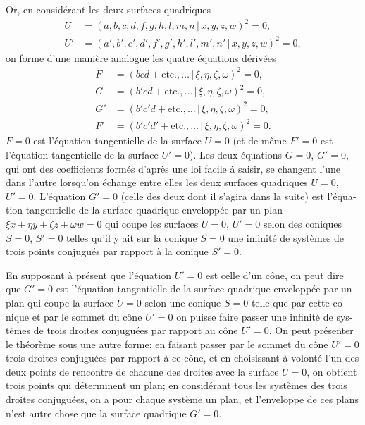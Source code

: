 \documentclass[11pt,a4paper]{article}
\providecommand{\mid}{\,|\,}
\begin{document}
\begin{otherlanguage}{french}
Or, en consid\'erant les deux surfaces quadriques
\[
\begin{aligned}
U &= (a, b, c, d, f, g, h, l, m, n \mid x, y, z, w)^{2} = 0,\\
U' &= (a', b', c', d', f', g', h', l', m', n' \mid x, y, z, w)^{2} = 0,
\end{aligned}
\]
on forme d'une mani\`ere analogue les quatre \'equations d\'eriv\'ees
\[
\begin{aligned}
F  &= (bcd + \text{etc.}, \ldots \mid \xi, \eta, \zeta, \omega)^{2} = 0,\\
G  &= (b'cd + \text{etc.}, \ldots \mid \xi, \eta, \zeta, \omega)^{2} = 0,\\
G' &= (b'c'd + \text{etc.}, \ldots \mid \xi, \eta, \zeta, \omega)^{2} = 0,\\
F' &= (b'c'd' + \text{etc.}, \ldots \mid \xi, \eta, \zeta, \omega)^{2} = 0.
\end{aligned}
\]
$F = 0$ est l'\'equation tangentielle de la surface $U = 0$ (et de m\^eme $F' = 0$ est l'\'equation tangentielle de la surface $U' = 0$). Les deux \'equations $G = 0$, $G' = 0$, qui ont des coefficients form\'es d'apr\`es une loi facile \`a saisir, se changent l'une dans l'autre lorsqu'on \'echange entre elles les deux surfaces quadriques $U = 0$, $U' = 0$. L'\'equation $G' = 0$ (celle des deux dont il s'agira dans la suite) est l'\'equation tangentielle de la surface quadrique envelopp\'ee par un plan $\xi x + \eta y + \zeta z + \omega w = 0$ qui coupe les surfaces $U = 0$, $U' = 0$ selon des coniques $S = 0$, $S' = 0$ telles qu'il y ait sur la conique $S = 0$ une infinit\'e de syst\`emes de trois points conjugu\'es par rapport \`a la conique $S' = 0$.

En supposant \`a pr\'esent que l'\'equation $U' = 0$ est celle d'un c\^one, on peut dire que $G' = 0$ est l'\'equation tangentielle de la surface quadrique envelopp\'ee par un plan qui coupe la surface $U = 0$ selon une conique $S = 0$ telle que par cette conique et par le sommet du c\^one $U' = 0$ on puisse faire passer une infinit\'e de syst\`emes de trois droites conjugu\'ees par rapport au c\^one $U' = 0$. On peut pr\'esenter le th\'eor\`eme sous une autre forme; en faisant passer par le sommet du c\^one $U' = 0$ trois droites conjugu\'ees par rapport \`a ce c\^one, et en choisissant \`a volont\'e l'un des deux points de rencontre de chacune des droites avec la surface $U = 0$, on obtient trois points qui d\'eterminent un plan; en consid\'erant tous les syst\`emes des trois droites conjugu\'ees, on a pour chaque syst\`eme un plan, et l'enveloppe de ces plans n'est autre chose que la surface quadrique $G' = 0$.


\end{otherlanguage}
\end{document}
